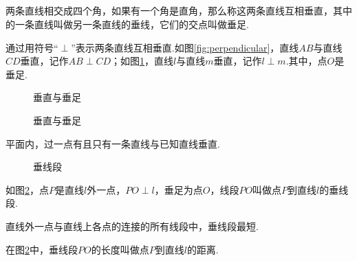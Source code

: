 \documentclass[fontset=windows]{ctexrep}
\begin{document}
\subsection{}
\par 两条直线相交成四个角，如果有一个角是直角，那么称这两条直线互相{\heiti 垂直}，其中的一条直线叫做另一条直线的垂线，它们的交点叫做{\heiti 垂足}.
\par 通过用符号“$\perp$”表示两条直线互相垂直.如图\ref{fig:perpendicular}，直线$AB$与直线$CD$垂直，记作$AB\perp CD$；如图\ref{fig:perp2}，直线$l$与直线$m$垂直，记作$l\perp m$.其中，点$O$是垂足.
\begin{figure}[htbp]
    \begin{minipage}[b]{.5\linewidth}
        \centering
        \caption{垂直与垂足\uppercase\expandafter{}}
        \label{fig:perpendicular}
    \end{minipage}
    \medskip
    \begin{minipage}[b]{.5\linewidth}
        \centering
        \caption{垂直与垂足\uppercase\expandafter{}}
        \label{fig:perp2}
    \end{minipage}
\end{figure}
\par 平面内，过一点有且只有一条直线与已知直线垂直.
\begin{figure}[htbp]
    \centering
    \caption{垂线段}
    \label{fig:perp3}
\end{figure}
\par 如图\ref{fig:perp3}，点$P$是直线$l$外一点，$PO\perp l$，垂足为点$O$，线段$PO$叫做点$P$到直线$l$的{\heiti 垂线段}.
\par 直线外一点与直线上各点的连接的所有线段中，垂线段最短.
\par 在图\ref{fig:perp3}中，垂线段$PO$的长度叫做点$P$到直线$l$的距离.
\end{document}

